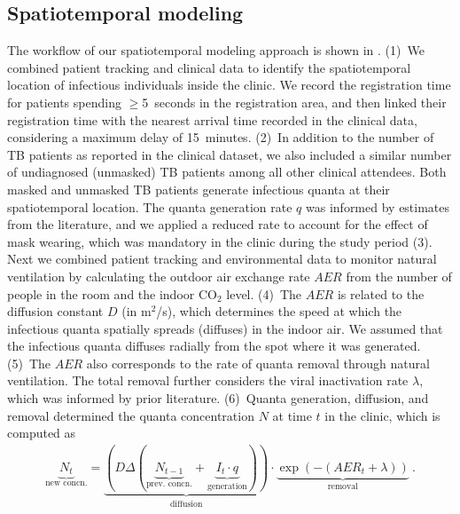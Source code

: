 \documentclass[fleqn,11pt]{wlscirep}
\begin{document}
\subsection{Spatiotemporal modeling}

The workflow of our spatiotemporal modeling approach is shown in . (1)~We combined patient tracking and clinical data to identify the spatiotemporal location of infectious individuals inside the clinic. We record the registration time for patients spending $\geq$5~seconds in the registration area, and then linked their registration time with the nearest arrival time recorded in the clinical data, considering a maximum delay of 15~minutes. (2)~In addition to the number of TB patients as reported in the clinical dataset, we also included a similar number of undiagnosed (unmasked) TB patients among all other clinical attendees\cite{Berhanu2023CID}. Both masked and unmasked TB patients generate infectious quanta at their spatiotemporal location. The quanta generation rate $q$ was informed by estimates from the literature\cite{Andrews2014JID,Riley1962ARRD,Escombe2008PLoSMed,Nardell1991ARRD}, and we applied a reduced rate to account for the effect of mask wearing\cite{Dharmadhikari2012AJRCCM}, which was mandatory in the clinic during the study period (3). Next we combined patient tracking and environmental data to monitor natural ventilation by calculating the outdoor air exchange rate $AER$ from the number of people in the room and the indoor CO$_2$ level\cite{Batterman2017IJERPH}. (4)~The $AER$ is related to the diffusion constant $D$ (in m$^2$/s)\cite{Cheng2011EnvSciTech}, which determines the speed at which the infectious quanta spatially spreads (diffuses) in the indoor air. We assumed that the infectious quanta diffuses radially from the spot where it was generated. (5)~The $AER$ also corresponds to the rate of quanta removal through natural ventilation. The total removal further considers the viral inactivation rate $\lambda$, which was informed by prior literature\cite{Loudon1969AMRRD,Lever2000LettersAppliedMicrobio,Gannon2007ResVetSci,Klein2014IJMyco}. (6)~Quanta generation, diffusion, and removal determined the quanta concentration $N$ at time $t$ in the clinic, which is computed as 
\begin{align}\label{eq:spattemp-N}
    \underbrace{N_{t}}_{\text{new concn.}} = \underbrace{\left(D \Delta (\underbrace{N_{t-1}}_{\text{prev. concn.}} + \underbrace{I_t \cdot q}_{\text{generation}})\right)}_{\text{diffusion}} \cdot \underbrace{\exp\left(-(AER_t + \lambda)\right)}_{\text{removal}} ~.
\end{align}
\end{document}

